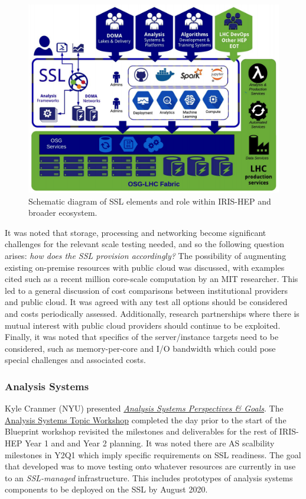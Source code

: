 \documentclass[11pt,letterpaper,fleqn]{article}
\begin{document}
\begin{figure}[ht!]
  \centering
  \includegraphics[width=0.99\linewidth]{figures/ssl.png}
  \vspace{-0.3cm}
  \caption{Schematic diagram of SSL elements and role within IRIS-HEP and broader ecosystem.}
  \label{fig:ssl}
\end{figure}

It was noted that storage, processing and networking become significant challenges for the relevant scale testing needed, and so the following question arises: \textit{how does the SSL provision accordingly?} The possibility of augmenting existing on-premise resources with public cloud was discussed, with examples cited such as a recent million core-scale computation by an MIT researcher. This led to a general discussion of cost comparisons between institutional providers and public cloud. It was agreed with any test all options should be considered and costs periodically assessed. Additionally, research partnerships where there is mutual interest with public cloud providers should continue to be exploited. Finally, it was noted that specifics of the server/instance targets need to be considered, such as memory-per-core and I/O bandwidth which could pose special challenges and associated costs.

\subsubsection{Analysis Systems}
\vspace{0.2cm}
Kyle Cranmer (NYU) presented \href{https://indico.cern.ch/event/820946/contributions/3461589/attachments/1867063/3070546/AS-SSL-Blueprint.pdf}{\textit{Analysis Systems Perspectives \& Goals}}. The \href{https://indico.cern.ch/event/822074/}{Analysis Systems Topic Workshop} completed the day prior to the start of the Blueprint workshop revisited the milestones and deliverables for the rest of IRIS-HEP Year 1 and and Year 2 planning. It was noted there are AS scalbility milestones in Y2Q1 which imply specific requirements on SSL readiness. The goal that developed was to move testing onto whatever resources are currently in use to an \textit{SSL-managed} infrastructure. This includes prototypes of analysis systems components to be deployed on the SSL by August 2020.
\end{document}
